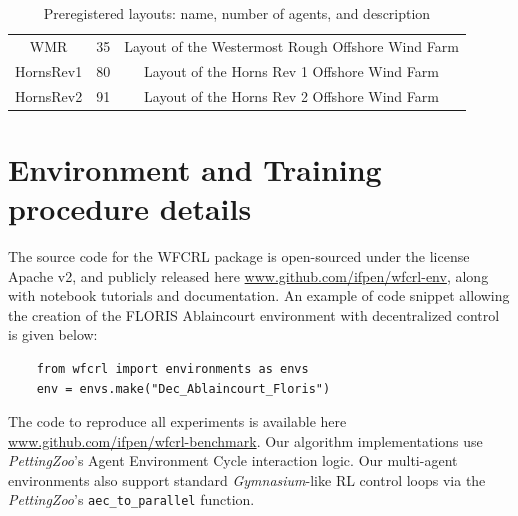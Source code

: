 \documentclass{article}
\begin{document}
\begin{table}[!htb]
\begin{tabular}{ccc}
WMR                              & 35                 & Layout of the Westermost Rough Offshore Wind Farm                                                                                                         \\
HornsRev1                        & 80                 & Layout of the Horns Rev 1 Offshore Wind Farm                                                                                                              \\
HornsRev2                        & 91                 & Layout of the Horns Rev 2 Offshore Wind Farm  \\                                                    
\hline                                                        
\end{tabular}
\caption{Preregistered layouts: name, number of agents, and description}
\label{tab:layoutscharacs}
\end{table}




\newpage

\section{Environment and Training procedure details}\label{appendix:training-details}

The source code for the WFCRL package is open-sourced under the license Apache v2, and publicly released here \url{www.github.com/ifpen/wfcrl-env}, along with notebook tutorials and documentation.
An example of code snippet allowing the creation of the FLORIS Ablaincourt environment with decentralized control is given below:
\begin{lstlisting}
    from wfcrl import environments as envs
    env = envs.make("Dec_Ablaincourt_Floris")
\end{lstlisting}

The code to reproduce all experiments is available here \url{www.github.com/ifpen/wfcrl-benchmark}. Our algorithm implementations use \textit{PettingZoo}'s Agent Environment Cycle \cite{pettingzoo} interaction logic. Our multi-agent environments also support standard \textit{Gymnasium}-like RL control loops via the \textit{PettingZoo}'s \texttt{aec\_to\_parallel} function.
\end{document}
